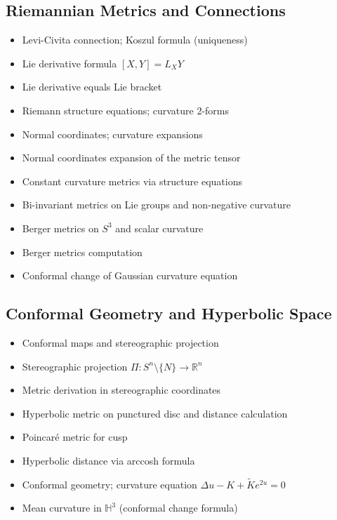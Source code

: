 \documentclass{amsart}
\begin{document}
\subsection{Riemannian Metrics and Connections}
\begin{itemize}
    \item Levi-Civita connection; Koszul formula (uniqueness)
    \item Lie derivative formula $[X,Y] = L_X Y$
    \item Lie derivative equals Lie bracket
    \item Riemann structure equations; curvature 2-forms
    \item Normal coordinates; curvature expansions
    \item Normal coordinates expansion of the metric tensor
    \item Constant curvature metrics via structure equations
    \item Bi-invariant metrics on Lie groups and non-negative curvature
    \item Berger metrics on $S^3$ and scalar curvature
    \item Berger metrics computation
    \item Conformal change of Gaussian curvature equation
    \end{itemize}

\subsection{Conformal Geometry and Hyperbolic Space}
\begin{itemize}
    \item Conformal maps and stereographic projection
    \item Stereographic projection $\Pi: S^n \setminus \{N\} \to \mathbb{R}^n$
    \item Metric derivation in stereographic coordinates
    \item Hyperbolic metric on punctured disc and distance calculation
    \item Poincaré metric for cusp
    \item Hyperbolic distance via arccosh formula
    \item Conformal geometry; curvature equation $\Delta u - K + \widetilde{K}e^{2u} = 0$
    \item Mean curvature in $\mathbb{H}^3$ (conformal change formula)
    \end{itemize}
\end{document}
